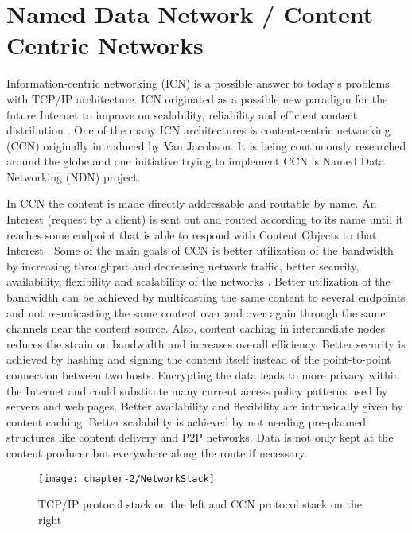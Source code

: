 \newpage

\section{Named Data Network / Content Centric Networks}

Information-centric networking (ICN) is a possible answer to today's problems with TCP/IP architecture. ICN originated as a possible new paradigm for the future Internet to improve on scalability, reliability and efficient content distribution \cite{jacobson09, ndn17}. One of the many ICN architectures is content-centric networking (CCN) originally introduced by Van Jacobson. It is being continuously researched around the globe and one initiative trying to implement CCN is Named Data Networking (NDN) project.

\vspace{5mm} %

In CCN the content is made directly addressable and routable by name. An Interest (request by a client) is sent out and routed according to its name until it reaches some endpoint that is able to respond with Content Objects to that Interest \cite{jacobson09}. Some of the main goals of CCN is better utilization of the bandwidth by increasing throughput and decreasing network traffic, better security, availability, flexibility and scalability of the networks \cite{ndn17}. Better utilization of the bandwidth can be achieved by multicasting the same content to several endpoints and not re-unicasting the same content over and over again through the same channels near the content source. Also, content caching in intermediate nodes reduces the strain on bandwidth and increases overall efficiency. Better security is achieved by hashing and signing the content itself instead of the point-to-point connection between two hosts. Encrypting the data leads to more privacy within the Internet and could substitute many current access policy patterns used by servers and web pages. Better availability and flexibility are intrinsically given by content caching. Better scalability is achieved by not needing pre-planned structures like content delivery and P2P networks. Data is not only kept at the content producer but everywhere along the route if necessary.

\vspace{5mm} %

\begin{figure}[H]
  \centering
  \texttt{[image: chapter-2/NetworkStack]}
  \caption{TCP/IP protocol stack on the left and CCN protocol stack on the right \cite{jacobson09}}
  \label{fig:NetworkStack}
\end{figure}

